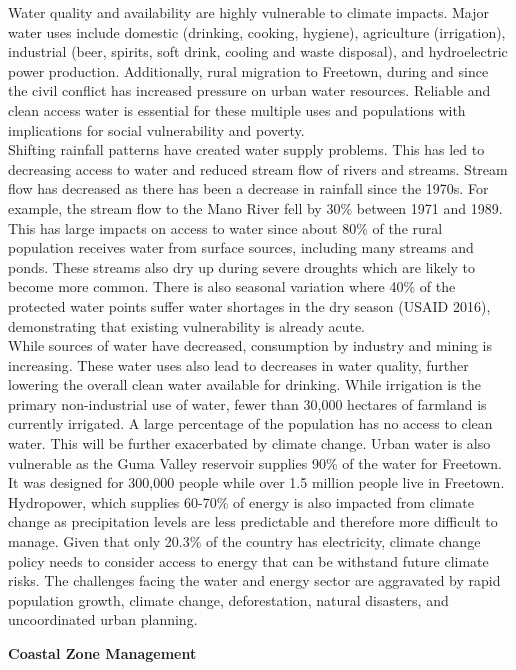 \documentclass[
]{book}
\begin{document}
Water quality and availability are highly vulnerable to climate impacts. Major water uses include domestic (drinking, cooking, hygiene), agriculture (irrigation), industrial (beer, spirits, soft drink, cooling and waste disposal), and hydroelectric power production. Additionally, rural migration to Freetown, during and since the civil conflict has increased pressure on urban water resources. Reliable and clean access water is essential for these multiple uses and populations with implications for social vulnerability and poverty.\\
Shifting rainfall patterns have created water supply problems. This has led to decreasing access to water and reduced stream flow of rivers and streams. Stream flow has decreased as there has been a decrease in rainfall since the 1970s. For example, the stream flow to the Mano River fell by 30\% between 1971 and 1989. This has large impacts on access to water since about 80\% of the rural population receives water from surface sources, including many streams and ponds. These streams also dry up during severe droughts which are likely to become more common. There is also seasonal variation where 40\% of the protected water points suffer water shortages in the dry season (USAID 2016), demonstrating that existing vulnerability is already acute.\\
While sources of water have decreased, consumption by industry and mining is increasing. These water uses also lead to decreases in water quality, further lowering the overall clean water available for drinking. While irrigation is the primary non-industrial use of water, fewer than 30,000 hectares of farmland is currently irrigated. A large percentage of the population has no access to clean water. This will be further exacerbated by climate change. Urban water is also vulnerable as the Guma Valley reservoir supplies 90\% of the water for Freetown. It was designed for 300,000 people while over 1.5 million people live in Freetown.\\
Hydropower, which supplies 60-70\% of energy is also impacted from climate change as precipitation levels are less predictable and therefore more difficult to manage. Given that only 20.3\% of the country has electricity, climate change policy needs to consider access to energy that can be withstand future climate risks. The challenges facing the water and energy sector are aggravated by rapid population growth, climate change, deforestation, natural disasters, and uncoordinated urban planning.

\textbf{Coastal Zone Management}
\end{document}
